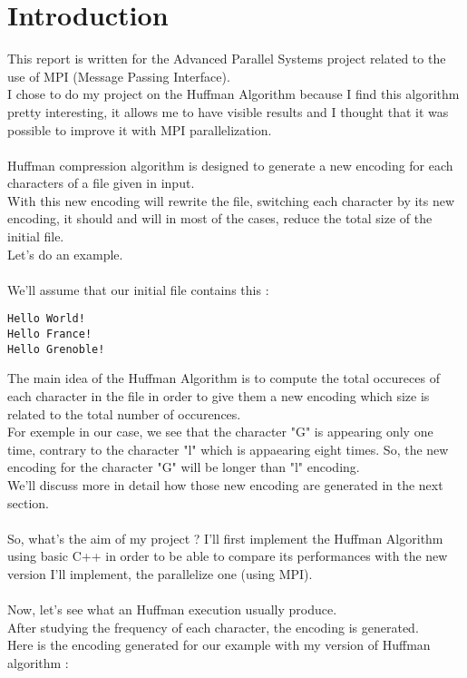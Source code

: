 \section{Introduction}
This report is written for the Advanced Parallel Systems project related to the use of MPI (Message Passing Interface).\\
I chose to do my project on the Huffman Algorithm because I find this algorithm pretty interesting, it allows me to have visible results and I thought that it was possible to improve it with MPI parallelization.\\
\\
Huffman compression algorithm is designed to generate a new encoding for each characters of a file given in input.\\
With this new encoding will rewrite the file, switching each character by its new encoding, it should and will in most of the cases, reduce the total size of the initial file.\\
Let's do an example.\\
\\
We'll assume that our initial file contains this :
\begin{verbatim}
Hello World!
Hello France!
Hello Grenoble!
\end{verbatim}
The main idea of the Huffman Algorithm is to compute the total occureces of each character in the file in order to give them a new encoding which size is related to the total number of occurences.\\
For exemple in our case, we see that the character "G" is appearing only one time, contrary to the character "l" which is appaearing eight times. So, the new encoding for the character "G" will be longer than "l" encoding.\\
We'll discuss more in detail how those new encoding are generated in the next section.\\
\\
So, what's the aim of my project ? I'll first implement the Huffman Algorithm using basic C++ in order to be able to compare its performances with the new version I'll implement, the parallelize one (using MPI).\\
\\
Now, let's see what an Huffman execution usually produce.\\
After studying the frequency of each character, the encoding is generated.\\
Here is the encoding generated for our example with my version of Huffman algorithm :
